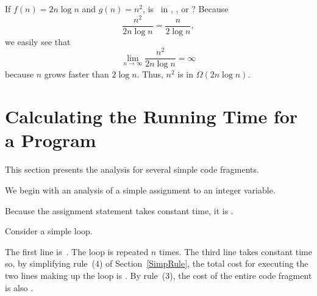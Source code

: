 \begin{example}
If \(f(n) = 2n\log n\) and \(g(n)=n^2\), is \fn\ in \Ogn, \Omegagn, or
\Thetagn?
Because
\[\frac{n^2}{2n\log n} = \frac{n}{2\log n},\]
we easily see that
\[\lim_{n \rightarrow \infty} \frac{n^2}{2n\log n} = \infty\]
because \(n\) grows faster than \(2\log n\).
Thus, \(n^2\) is in \(\Omega(2n\log n)\).
\end{example}

\section{Calculating the Running Time for a Program}
\label{ProgTimeSec}

This section presents the analysis for several simple code
fragments.

\begin{example}
We begin with an analysis of a simple assignment to an integer
variable.

\vspace{-\medskipamount}

\vspace{-\medskipamount}
\noindent Because the assignment statement takes constant time, it is
\Thetaone.
\end{example}

\begin{example}
\label{FLAnal}
Consider a simple  loop.

\vspace{-\medskipamount}

\vspace{-\medskipamount}
The first line is~\Thetaone.
The  loop is repeated \(n\) times.
The third line takes constant time so, by simplifying rule~(4)
of Section~\ref{SimpRule}, the total cost for executing the two lines
making up the  loop is \Thetan.
By rule~(3), the cost of the entire code fragment is also
\Thetan.
\end{example}

